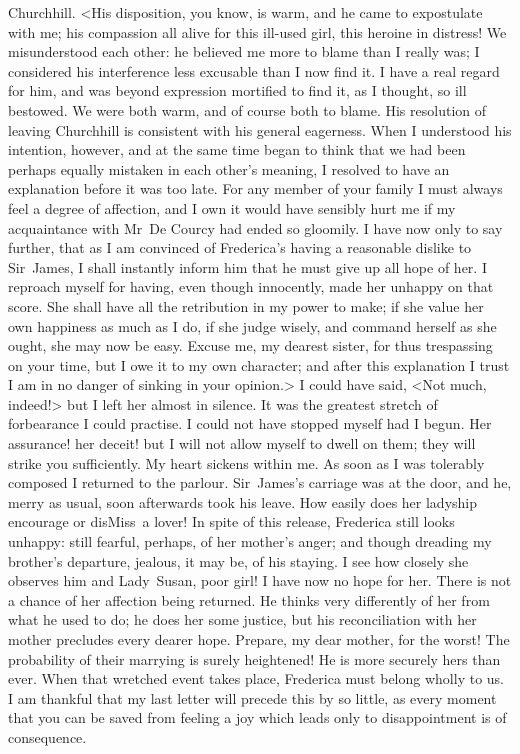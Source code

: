 \begin{mail}{Churchhill.}{}
<His disposition, you know, is warm, and he came to expostulate with me; his compassion all alive for this ill-used girl, this heroine in distress! We misunderstood each other: he believed me more to blame than I really was; I considered his interference less excusable than I now find it. I have a real regard for him, and was beyond expression mortified to find it, as I thought, so ill bestowed. We were both warm, and of course both to blame. His resolution of leaving Churchhill is consistent with his general eagerness. When I understood his intention, however, and at the same time began to think that we had been perhaps equally mistaken in each other's meaning, I resolved to have an explanation before it was too late. For any member of your family I must always feel a degree of affection, and I own it would have sensibly hurt me if my acquaintance with Mr~De Courcy had ended so gloomily. I have now only to say further, that as I am convinced of Frederica's having a reasonable dislike to Sir~James, I shall instantly inform him that he must give up all hope of her. I reproach myself for having, even though innocently, made her unhappy on that score. She shall have all the retribution in my power to make; if she value her own happiness as much as I do, if she judge wisely, and command herself as she ought, she may now be easy. Excuse me, my dearest sister, for thus trespassing on your time, but I owe it to my own character; and after this explanation I trust I am in no danger of sinking in your opinion.> I could have said, <Not much, indeed!> but I left her almost in silence. It was the greatest stretch of forbearance I could practise. I could not have stopped myself had I begun. Her assurance! her deceit! but I will not allow myself to dwell on them; they will strike you sufficiently. My heart sickens within me. As soon as I was tolerably composed I returned to the parlour. Sir~James's carriage was at the door, and he, merry as usual, soon afterwards took his leave. How easily does her ladyship encourage or disMiss~a lover! In spite of this release, Frederica still looks unhappy: still fearful, perhaps, of her mother's anger; and though dreading my brother's departure, jealous, it may be, of his staying. I see how closely she observes him and Lady~Susan, poor girl! I have now no hope for her. There is not a chance of her affection being returned. He thinks very differently of her from what he used to do; he does her some justice, but his reconciliation with her mother precludes every dearer hope. Prepare, my dear mother, for the worst! The probability of their marrying is surely heightened! He is more securely hers than ever. When that wretched event takes place, Frederica must belong wholly to us. I am thankful that my last letter will precede this by so little, as every moment that you can be saved from feeling a joy which leads only to disappointment is of consequence. 

\end{mail}